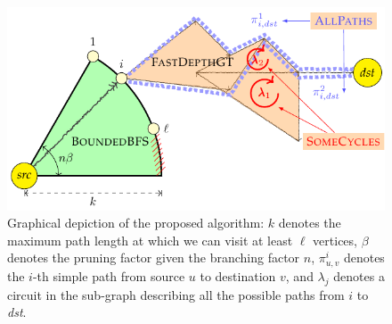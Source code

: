 \documentclass[acmengage]{acmart}
\begin{document}
\begin{figure}[!t]
\includegraphics[width=.9\linewidth]{fig/algo_intuition}
\caption{Graphical depiction of the proposed algorithm: $k$ denotes the maximum path length at which we can visit at least $\ell$ vertices, $\beta$ denotes the pruning factor given the branching factor $n$, $\pi_{u,v}^i$ denotes the $i$-th simple path from source $u$ to destination $v$, and $\lambda_j$ denotes a circuit in the sub-graph describing all the possible paths from $i$ to \textit{dst}.}\label{fig:depict}
\end{figure}
\end{document}

